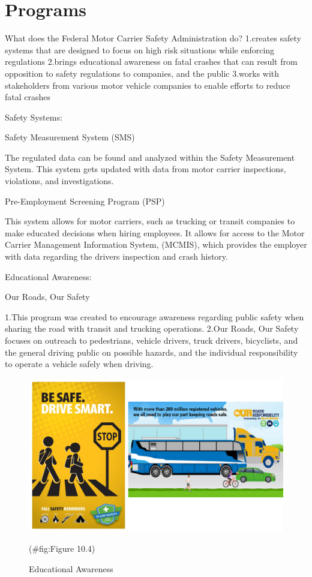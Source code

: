\documentclass[
]{book}
\begin{document}
\hypertarget{safety-Programs}{%
\section{Programs}\label{safety-Programs}}

What does the Federal Motor Carrier Safety Administration do?
1.creates safety systems that are designed to focus on high risk situations while enforcing regulations
2.brings educational awareness on fatal crashes that can result from opposition to safety regulations to companies, and the public
3.works with stakeholders from various motor vehicle companies to enable efforts to reduce fatal crashes

Safety Systems:

Safety Measurement System (SMS)

The regulated data can be found and analyzed within the Safety Measurement System. This system gets updated with data from motor carrier inspections, violations, and investigations.

Pre-Employment Screening Program (PSP)

This system allows for motor carriers, such as trucking or transit companies to make educated decisions when hiring employees.
It allows for access to the Motor Carrier Management Information System, (MCMIS), which provides the employer with data regarding the drivers inspection and crash history.

Educational Awareness:

Our Roads, Our Safety

1.This program was created to encourage awareness regarding public safety when sharing the road with transit and trucking operations.
2.Our Roads, Our Safety focuses on outreach to pedestrians, vehicle drivers, truck drivers, bicyclists, and the general driving public on possible hazards, and the individual responsibility to operate a vehicle safely when driving.

\begin{figure}

{\centering \includegraphics{./Images/Enforcement and Safety Organizations/Educational Awareness} 

}

\caption{Educational Awareness}(\#fig:Figure 10.4)
\end{figure}
\end{document}
